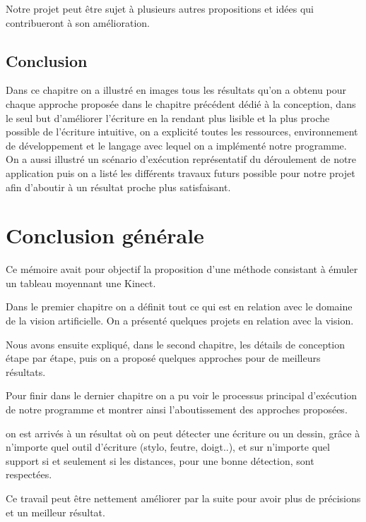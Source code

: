 \documentclass[12pt,a4paper,oneside]{book}
\begin{document}
	Notre projet peut être sujet à plusieurs autres propositions et idées qui contribueront à son amélioration.
	
	
	\section{Conclusion}	
	Dans ce chapitre on a illustré en images tous les résultats qu'on a obtenu pour chaque approche proposée dans le chapitre précédent dédié à la conception, dans le seul but d'améliorer l'écriture en la rendant plus lisible et la plus proche possible de l'écriture intuitive, on a explicité toutes les ressources, environnement de développement et le langage avec lequel on a implémenté notre programme. On a aussi illustré un scénario d'exécution représentatif du déroulement de notre application  puis on a listé les différents travaux futurs possible pour notre projet afin d'aboutir à un résultat proche plus satisfaisant. 
	
	
	\newpage
	\chapter*{Conclusion générale}
	
	Ce mémoire avait pour objectif la proposition d'une méthode consistant à émuler un tableau moyennant une Kinect.
	
	Dans le premier chapitre on a définit tout ce qui est en relation avec le domaine de la vision artificielle.
	On a présenté quelques projets en relation avec la vision. 
	
	Nous avons ensuite expliqué, dans le second chapitre, les détails de conception étape par étape, puis on a proposé quelques approches pour de meilleurs résultats. 
	
	Pour finir dans le dernier chapitre  on a pu voir le processus  principal d'exécution de notre programme et montrer ainsi l'aboutissement des approches proposées.
	
	on est arrivés à un résultat où on peut détecter une écriture ou un dessin, grâce à n'importe quel outil d'écriture (stylo, feutre, doigt..), et  sur n'importe quel support  si  et seulement si les distances, pour une bonne détection, sont respectées. 
	
	Ce travail peut être  nettement améliorer par la suite pour avoir plus de précisions et un meilleur résultat. 
	
	
	
	
\end{document}
